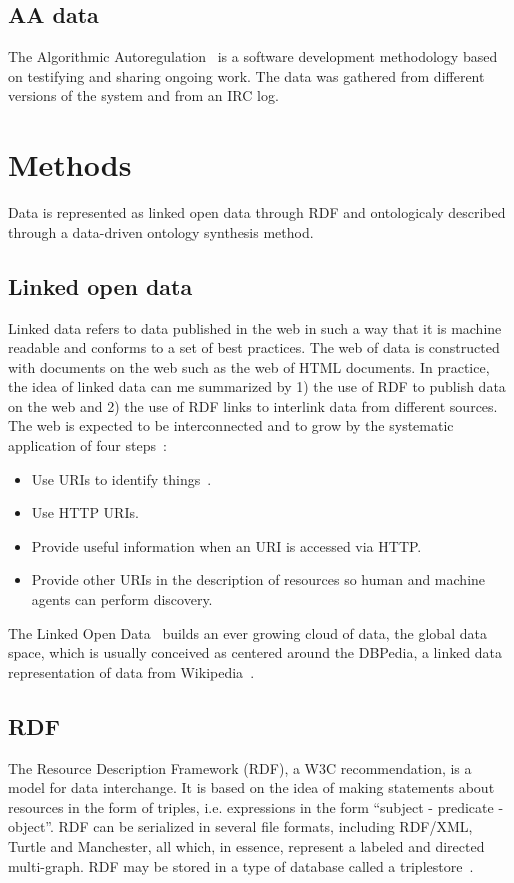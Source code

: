 \documentclass[review]{elsarticle}
\begin{document}
\subsection{AA data}
The Algorithmic Autoregulation~\cite{aa} is a software development
methodology based on testifying and sharing ongoing work.
The data was gathered from different versions of the system and from an IRC
log.

\section{Methods}
Data is represented as linked open data through
RDF and ontologicaly described through a data-driven ontology synthesis
method.

\subsection{Linked open data}
Linked data refers to data published in the web in such a way that it is
machine readable and conforms to a set of best practices.
The web of data is constructed with documents on the web 
such as the web of HTML documents.
In practice, the idea of linked data can me summarized
by 1) the use of RDF to publish data on the web and 2) the use of RDF
links to interlink data from different sources.
The web is expected to be interconnected and to grow by the systematic application of four
steps~\cite{lee1}:
\begin{itemize}
    \item Use URIs to identify things~\cite{uri}.
    \item Use HTTP URIs.
    \item Provide useful information when an URI is accessed via HTTP.
    \item Provide other URIs in the description of resources so human
        and machine agents can perform discovery.
\end{itemize}

The Linked Open Data~\cite{lod} builds an ever growing cloud of data,
the global data space, which is usually
conceived as centered around the DBPedia, a linked data representation
of data from Wikipedia~\cite{dbpedia0,dbpedia}.

\subsection{RDF}
The Resource Description Framework (RDF), a W3C
recommendation, is a model for data
interchange.
It is based on the idea of making statements about resources in the form
of triples, i.e. expressions in the form ``subject - predicate -
object''.
RDF can be serialized in several file formats, including RDF/XML,
Turtle and Manchester, all which, in essence, represent a labeled and
directed multi-graph.
RDF may be stored in a type of database called a triplestore~\cite{rdf}.
\end{document}
